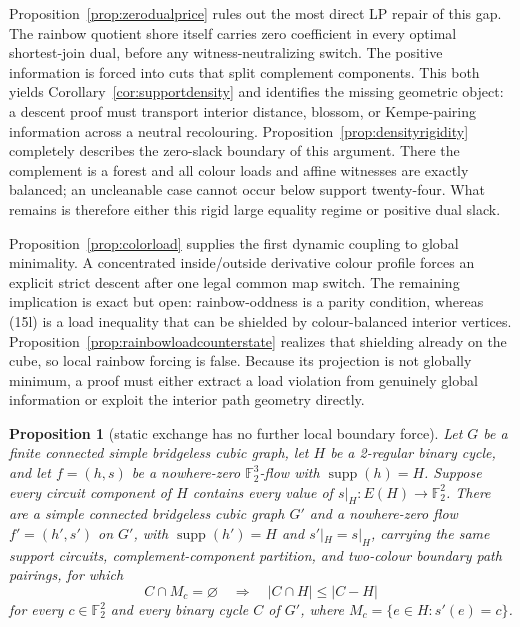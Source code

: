 \documentclass[11pt]{article}
\newtheorem{proposition}[theorem]{Proposition}
\theoremstyle{definition}
\theoremstyle{remark}
\newcommand{\F}{\mathbb F}
\newcommand{\supp}{\operatorname{supp}}
\begin{document}
Proposition~\ref{prop:zerodualprice} rules out the most direct LP repair
of this gap.  The rainbow quotient shore itself carries zero coefficient
in every optimal shortest-join dual, before any witness-neutralizing
switch.  The positive information is forced into cuts that split
complement components.  This both yields
Corollary~\ref{cor:supportdensity} and identifies the missing geometric
object: a descent proof must transport interior distance, blossom, or
Kempe-pairing information across a neutral recolouring.
Proposition~\ref{prop:densityrigidity} completely describes the zero-slack
boundary of this argument.  There the complement is a forest and all
colour loads and affine witnesses are exactly balanced; an uncleanable
case cannot occur below support twenty-four.  What remains is therefore
either this rigid large equality regime or positive dual slack.

Proposition~\ref{prop:colorload} supplies the first dynamic coupling to
global minimality.  A concentrated inside/outside derivative colour
profile forces an explicit strict descent after one legal common map
switch.  The remaining implication is exact but open: rainbow-oddness is
a parity condition, whereas (15l) is a load inequality that can be
shielded by colour-balanced interior vertices.
Proposition~\ref{prop:rainbowloadcounterstate} realizes that shielding
already on the cube, so local rainbow forcing is false.  Because its
projection is not globally minimum, a proof must either extract a
load violation from genuinely global information or exploit the interior
path geometry directly.

\begin{proposition}[static exchange has no further local boundary force]
\label{prop:staticinflation}
Let \(G\) be a finite connected simple bridgeless cubic graph, let \(H\)
be a 2-regular binary cycle, and let \(f=(h,s)\) be a nowhere-zero
\(\F_2^3\)-flow with \(\supp(h)=H\).  Suppose every circuit component of
\(H\) contains every value of \(s|_H:E(H)\to\F_2^2\).
There are a simple connected bridgeless cubic graph \(G'\) and a
nowhere-zero flow \(f'=(h',s')\) on \(G'\), with
\(\supp(h')=H\) and \(s'|_H=s|_H\), carrying the same support circuits,
complement-component partition, and two-colour boundary path pairings,
for which
\[
 C\cap M_c=\varnothing
 \quad\Longrightarrow\quad
 |C\cap H|\leq |C-H|                                   \tag{27}
\]
for every \(c\in\F_2^2\) and every binary cycle \(C\) of \(G'\), where
\(M_c=\{e\in H:s'(e)=c\}\).
\end{proposition}
\end{document}
